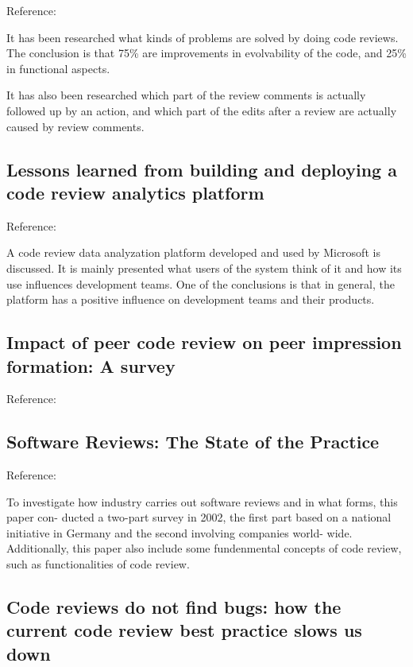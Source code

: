 \documentclass[]{book}
\begin{document}
Reference: \citet{beller2014modern}

It has been researched what kinds of problems are solved by doing code
reviews. The conclusion is that 75\% are improvements in evolvability of
the code, and 25\% in functional aspects.

It has also been researched which part of the review comments is
actually followed up by an action, and which part of the edits after a
review are actually caused by review comments.

\subsection{Lessons learned from building and deploying a code review
analytics
platform}\label{lessons-learned-from-building-and-deploying-a-code-review-analytics-platform}

Reference: \citet{bird2015lessons}

A code review data analyzation platform developed and used by Microsoft
is discussed. It is mainly presented what users of the system think of
it and how its use influences development teams. One of the conclusions
is that in general, the platform has a positive influence on development
teams and their products.

\subsection{Impact of peer code review on peer impression formation: A
survey}\label{impact-of-peer-code-review-on-peer-impression-formation-a-survey}

Reference: \citet{bosu2013impact}

\subsection{Software Reviews: The State of the
Practice}\label{software-reviews-the-state-of-the-practice}

Reference: \citet{ciolkowski2003software}

To investigate how industry carries out software reviews and in what
forms, this paper con- ducted a two-part survey in 2002, the first part
based on a national initiative in Germany and the second involving
companies world- wide. Additionally, this paper also include some
fundenmental concepts of code review, such as functionalities of code
review.

\subsection{Code reviews do not find bugs: how the current code review
best practice slows us
down}\label{code-reviews-do-not-find-bugs-how-the-current-code-review-best-practice-slows-us-down}
\end{document}
